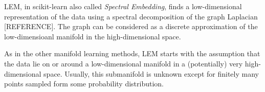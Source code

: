 \documentclass[journal, a4paper]{IEEEtran}
\begin{document}
LEM, in scikit-learn also called \textit{Spectral Embedding}, finds a low-dimensional representation of the data using a spectral decomposition of the graph Laplacian [REFERENCE].
The graph can be considered as a discrete approximation of the low-dimensioanl manifold in the high-dimensional space.

As in the other manifold learning methods, LEM starts with the assumption that the data lie on or around a low-dimensional manifold in a (potentially) very high-dimensional space. 
Usually, this submanifold is unknown except for finitely many points sampled form some probability distribution. 


%



%





\end{document}
